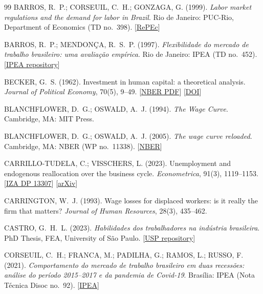 \documentclass[11pt,a4paper]{article}
\begin{document}
{\begin{thebibliography}{99}
BARROS, R.~P.; CORSEUIL, C.~H.; GONZAGA, G. (1999). \textit{Labor market regulations and the demand for labor in Brazil}. Rio de Janeiro: PUC-Rio, Department of Economics (TD no.~398). [\href{https://ideas.repec.org/p/rio/texdis/398.html}{RePEc}]

BARROS, R.~P.; MENDON\c{C}A, R.~S.~P. (1997). \textit{Flexibilidade do mercado de trabalho brasileiro: uma avalia\c{c}\~ao emp\'irica}. Rio de Janeiro: IPEA (TD no.~452). [\href{https://repositorio.ipea.gov.br/items/cfe45716-d907-4631-9c88-462cd6be302d}{IPEA repository}]

BECKER, G.~S. (1962). Investment in human capital: a theoretical analysis. \textit{Journal of Political Economy}, 70(5), 9--49. [\href{https://www.nber.org/system/files/chapters/c13571/c13571.pdf}{NBER PDF}] [\href{https://doi.org/10.1086/258724}{DOI}]

BLANCHFLOWER, D.~G.; OSWALD, A.~J. (1994). \textit{The Wage Curve}. Cambridge, MA: MIT Press.

BLANCHFLOWER, D.~G.; OSWALD, A.~J. (2005). \textit{The wage curve reloaded}. Cambridge, MA: NBER (WP no.~11338). [\href{https://www.nber.org/papers/w11338}{NBER}]

CARRILLO-TUDELA, C.; VISSCHERS, L. (2023). Unemployment and endogenous reallocation over the business cycle. \textit{Econometrica}, 91(3), 1119--1153. [\href{https://docs.iza.org/dp13307.pdf}{IZA DP 13307}] [\href{https://arxiv.org/abs/2304.00544}{arXiv}]

CARRINGTON, W.~J. (1993). Wage losses for displaced workers: is it really the firm that matters? \textit{Journal of Human Resources}, 28(3), 435--462.

CASTRO, G.~H.~L. (2023). \textit{Habilidades dos trabalhadores na ind\'ustria brasileira}. PhD Thesis, FEA, University of S\~ao Paulo. [\href{https://teses.usp.br/teses/disponiveis/12/12140/tde-30012024-193313/}{USP repository}]

CORSEUIL, C.~H.; FRANCA, M.; PADILHA, G.; RAMOS, L.; RUSSO, F. (2021). \textit{Comportamento do mercado de trabalho brasileiro em duas recess\~oes: an\'alise do per\'iodo 2015--2017 e da pandemia de Covid-19}. Bras\'ilia: IPEA (Nota T\'ecnica Disoc no.~92). [\href{https://www.ipea.gov.br/portal/categorias/129-coronavirus/publicacoes/8361-nota-tecnica-2021-fevereiro-numero-92-disoc}{IPEA}]


\end{thebibliography}}
\end{document}
